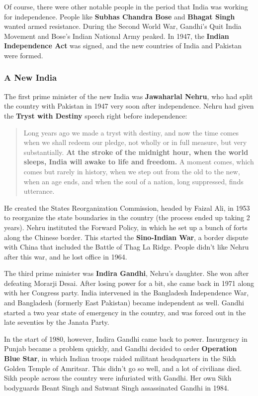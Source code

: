 Of course, there were other notable people in the period that India was working for independence.
People like \textbf{Subhas Chandra Bose} and \textbf{Bhagat Singh} wanted armed resistance.
During the Second World War, Gandhi's Quit India Movement and Bose's Indian National Army peaked.
In 1947, the \textbf{Indian Independence Act} was signed, and the new countries of India and Pakistan were formed.

\subsubsection*{A New India}

The first prime minister of the new India was \textbf{Jawaharlal Nehru},
who had split the country with Pakistan in 1947 very soon after independence.
Nehru had given the \textbf{Tryst with Destiny} speech right before independence:
\begin{quote}
  Long years ago we made a tryst with destiny, and now the time comes when we shall redeem our pledge,
  not wholly or in full measure, but very substantially.
  \textbf{At the stroke of the midnight hour, when the world sleeps, India will awake to life and freedom.}
  A moment comes, which comes but rarely in history, when we step out from the old to the new,
  when an age ends, and when the soul of a nation, long suppressed, finds utterance.
\end{quote}
He created the States Reorganization Commission, headed by Faizal Ali,
in 1953 to reorganize the state boundaries in the country (the process ended up taking 2 years).
Nehru instituted the Forward Policy, in which he set up a bunch of forts along the Chinese border.
This started the \textbf{Sino-Indian War}, a border dispute with China that included the Battle of Thag La Ridge.
People didn't like Nehru after this war, and he lost office in 1964.

The third prime minister was \textbf{Indira Gandhi}, Nehru's daughter.
She won after defeating Morarji Desai.
After losing power for a bit, she came back in 1971 along with her Congress party.
India intervened in the Bangladesh Independence War,
and Bangladesh (formerly East Pakistan) became independent as well.
Gandhi started a two year state of emergency in the country,
and was forced out in the late seventies by the Janata Party.

In the start of 1980, however, Indira Gandhi came back to power.
Insurgency in Punjab became a problem quickly, and Gandhi decided to order \textbf{Operation Blue Star},
in which Indian troops raided militant headquarters in the Sikh Golden Temple of Amritsar.
This didn't go so well, and a lot of civilians died.
Sikh people across the country were infuriated with Gandhi.
Her own Sikh bodyguards Beant Singh and Satwant Singh assassinated Gandhi in 1984.

